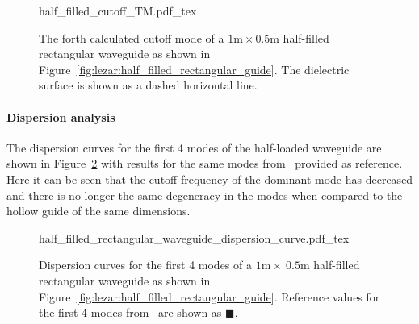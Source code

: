 \begin{figure}[h]
\centering
  \def\svgwidth{\smallfig}
    {half_filled_cutoff_TM.pdf_tex}
\caption{The forth calculated cutoff mode of a $1\text{m}\times0.5\text{m}$ half-filled rectangular waveguide as shown in Figure~\ref{fig:lezar:half_filled_rectangular_guide}. The dielectric surface is shown as a dashed horizontal line.}
\label{fig:lezar:half_filled_rectangular_cutoff_TM}
\end{figure}

\paragraph{Dispersion analysis}

The dispersion curves for the first 4 modes of the half-loaded waveguide are shown in Figure~\ref{fig:lezar:half_loaded_rectangular_dispersion_curves} with results for the same modes from~\citet{Jin2002} provided as reference. Here it can be seen that the cutoff frequency of the dominant mode has decreased and there is no longer the same degeneracy in the modes when compared to the hollow guide of the same dimensions.
\begin{figure}
 \centering
  \def\svgwidth{\largefig}
  {half_filled_rectangular_waveguide_dispersion_curve.pdf_tex}
 \caption{Dispersion curves for the first 4 modes of a $1\text{m}\times~0.5\text{m}$ half-filled rectangular waveguide as shown in Figure~\ref{fig:lezar:half_filled_rectangular_guide}. Reference values for the first 4 modes from~\citet{Jin2002} are shown as $\blacksquare$.}
 \label{fig:lezar:half_loaded_rectangular_dispersion_curves}
\end{figure}

